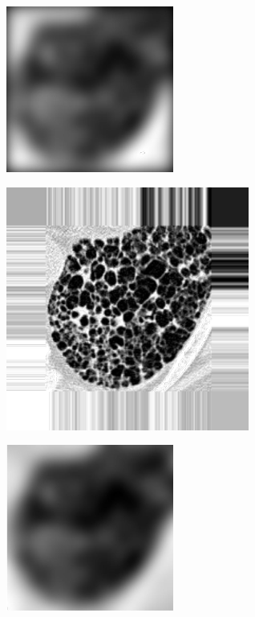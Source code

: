 \documentclass[fleqn,a4paper,oneside,openany]{book}
\begin{document}
\begin{figure}
\begin{minipage}[b]{150pt}
   \end{minipage}
   \begin{minipage}[b]{150pt}
     \centering
     \includegraphics[trim = 0 -34 0 0, clip, scale=0.57]{ZeroPadC_BC.png}
     \label{fig:boundaryConditions1_d}
     \hspace{100pt}
   \end{minipage}
   \begin{minipage}[b]{150pt}
     \centering
     \includegraphics[trim = 0 0 0 0, clip, scale=0.57]{NearestFext_BC.png}
     \label{fig:boundaryConditions1_e}
   \end{minipage}
   \begin{minipage}[b]{150pt}
     \centering
     \includegraphics[trim = 0 -34 0 0, clip, scale=0.57]{NearestC_BC.png}

\end{minipage}
\end{figure}
\end{document}
